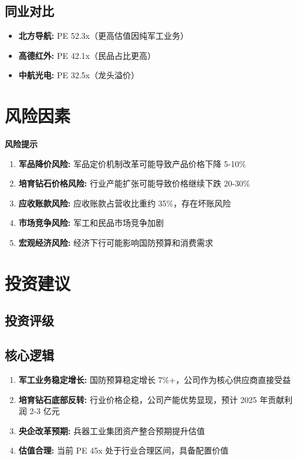 \documentclass[a4paper,11pt]{article}
\begin{document}
\subsection*{同业对比}
\begin{itemize}[leftmargin=*]
    \item \textbf{北方导航:} PE 52.3x（更高估值因纯军工业务）
    \item \textbf{高德红外:} PE 42.1x（民品占比更高）
    \item \textbf{中航光电:} PE 32.5x（龙头溢价）
\end{itemize}

\newpage

\section{风险因素}

\begin{riskbox}
\textbf{风险提示}
\end{riskbox}

\begin{enumerate}[leftmargin=*]
    \item \textbf{军品降价风险:} 军品定价机制改革可能导致产品价格下降 5-10\%
    \item \textbf{培育钻石价格风险:} 行业产能扩张可能导致价格继续下跌 20-30\%
    \item \textbf{应收账款风险:} 应收账款占营收比重约 35\%，存在坏账风险
    \item \textbf{市场竞争风险:} 军工和民品市场竞争加剧
    \item \textbf{宏观经济风险:} 经济下行可能影响国防预算和消费需求
\end{enumerate}

\newpage

\section{投资建议}

\subsection*{投资评级}
\begin{center}
\end{center}

\subsection*{核心逻辑}
\begin{enumerate}[leftmargin=*]
    \item \textbf{军工业务稳定增长:} 国防预算稳定增长 7\%+，公司作为核心供应商直接受益
    \item \textbf{培育钻石底部反转:} 行业价格企稳，公司产能优势显现，预计 2025 年贡献利润 2-3 亿元
    \item \textbf{央企改革预期:} 兵器工业集团资产整合预期提升估值
    \item \textbf{估值合理:} 当前 PE 45x 处于行业合理区间，具备配置价值
\end{enumerate}
\end{document}
